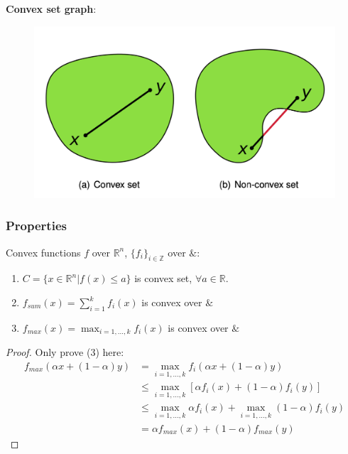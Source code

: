 \documentclass[11pt,a4paper]{article}
\begin{document}
\textbf{Convex set graph}:
\begin{center}\begin{figure}[htbp]
    \centering
    \includegraphics[scale=0.3]{Convex_set.png}
    \caption{}
    \label{}
\end{figure}\end{center}

\subsubsection{Properties}
Convex functions $f$ over $\mathbb{R}^n$, $\{f_i\}_{i\in \mathbb{Z}}$ over $\&$:
\begin{enumerate}[(1)]
    \item $C=\{x\in \mathbb{R}^n| f(x)\leq a\}$ is convex set, $\forall a\in \mathbb{R}$.
    \item $f_{sum}(x)=\sum_{i=1}^kf_i(x)$ is convex over $\&$
    \item $f_{max}(x)=\max_{i=1,...,k}f_i(x)$ is convex over $\&$
\end{enumerate}
\begin{proof} Only prove (3) here:
\begin{equation}
    \begin{aligned}
        f_{max}(\alpha x+(1-\alpha)y)&=\max_{i=1,...,k}f_i(\alpha x+(1-\alpha)y)\\
    &\leq \max_{i=1,...,k}[\alpha f_i(x)+(1-\alpha)f_i(y)]\\
    &\leq \max_{i=1,...,k}\alpha f_i(x)+\max_{i=1,...,k}(1-\alpha)f_i(y)\\
    &=\alpha f_{max}(x)+(1-\alpha)f_{max}(y)
    \end{aligned}
    \nonumber
\end{equation}
\end{proof}
\end{document}
